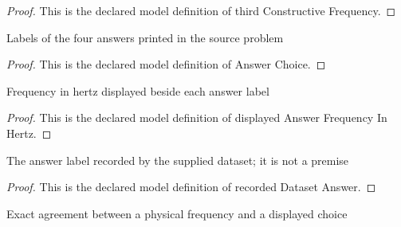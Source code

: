 \begin{proof}
  This is the declared model definition of third Constructive Frequency.
\end{proof}
\begin{definition}
  \label{def:physics:phyx-mini-0314:phyxminiproblems-problemphyxmini0314-answerchoice}
  Labels of the four answers printed in the source problem
\end{definition}
\begin{proof}
  This is the declared model definition of Answer Choice.
\end{proof}
\begin{definition}
  \label{def:physics:phyx-mini-0314:phyxminiproblems-problemphyxmini0314-displayedanswerfrequencyinhertz}
  Frequency in hertz displayed beside each answer label
\end{definition}
\begin{proof}
  This is the declared model definition of displayed Answer Frequency In Hertz.
\end{proof}
\begin{definition}
  \label{def:physics:phyx-mini-0314:phyxminiproblems-problemphyxmini0314-recordeddatasetanswer}
  The answer label recorded by the supplied dataset; it is not a premise
\end{definition}
\begin{proof}
  This is the declared model definition of recorded Dataset Answer.
\end{proof}
\begin{definition}
  \label{def:physics:phyx-mini-0314:phyxminiproblems-problemphyxmini0314-matchesanswerchoice}
  Exact agreement between a physical frequency and a displayed choice
\end{definition}
